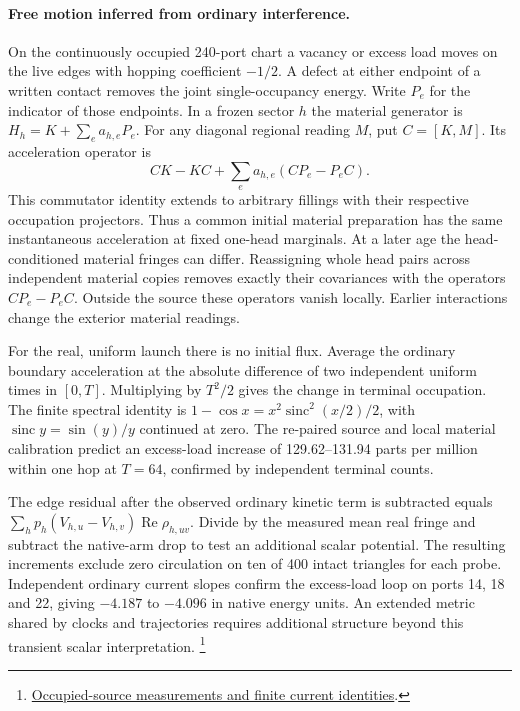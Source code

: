 \documentclass[11pt]{article}
\begin{document}
\paragraph{Free motion inferred from ordinary interference.}
On the continuously occupied 240-port chart a vacancy or excess load
moves on the live edges with hopping coefficient $-1/2$. A defect at
either endpoint of a written contact removes the joint single-occupancy
energy. Write $P_e$ for the indicator of those endpoints. In a frozen
sector $h$ the material generator is $H_h=K+\sum_e a_{h,e}P_e$.
For any diagonal regional reading $M$, put $C=[K,M]$. Its acceleration
operator is
\[
 CK-KC+\sum_e a_{h,e}(CP_e-P_eC).
\]
This commutator identity extends to arbitrary fillings with their
respective occupation projectors. Thus a common initial material
preparation has the same instantaneous acceleration at fixed one-head
marginals. At a later age the head-conditioned material fringes can
differ. Reassigning whole head pairs across independent material
copies removes exactly their covariances with the operators
$CP_e-P_eC$. Outside the source these operators vanish locally.
Earlier interactions change the exterior material readings.

For the real, uniform launch there is no initial flux. Average the
ordinary boundary acceleration at the absolute difference of two
independent uniform times in $[0,T]$. Multiplying by $T^2/2$ gives
the change in terminal occupation. The finite spectral identity is
$1-\cos x=x^2\operatorname{sinc}^2(x/2)/2$, with
$\operatorname{sinc} y=\sin(y)/y$ continued at zero.
The re-paired source and local material calibration predict an excess-load
increase of 129.62--131.94 parts per million within one hop at $T=64$,
confirmed by independent terminal counts.

The edge residual after the observed ordinary kinetic term is subtracted
equals $\sum_h p_h(V_{h,u}-V_{h,v})\operatorname{Re}\rho_{h,uv}$.
Divide by the measured mean real fringe and subtract the native-arm drop
to test an additional scalar potential. The resulting increments exclude
zero circulation on ten of 400 intact triangles for each probe.
Independent ordinary current slopes confirm the excess-load loop on
ports 14, 18 and 22, giving $-4.187$ to $-4.096$ in native energy units.
An extended metric shared by clocks and trajectories requires additional
structure beyond this transient scalar interpretation.%
\footnote{\href{https://github.com/FloatingPragma/observer-patch-holography/blob/main/model/experiments/interval_echo_shell_flux/product_address/green_response/material_recoil/overlap_source/native_boundary/stock/aperture/OCCUPIED_RESULTS.md}{Occupied-source measurements and finite current identities}.}
\end{document}
